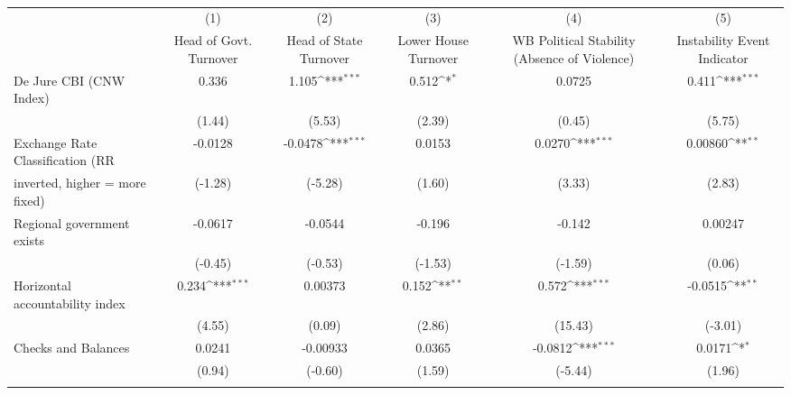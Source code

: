 \begin{table}[htbp]\centering
\def\sym#1{\ifmmode^{#1}\else\(^{#1}\)\fi}
\caption{\label{nccmultIndOLSDJ}}
\begin{tabular}{l*{5}{c}}
\toprule
                                        &\multicolumn{1}{c}{(1)}&\multicolumn{1}{c}{(2)}&\multicolumn{1}{c}{(3)}&\multicolumn{1}{c}{(4)}&\multicolumn{1}{c}{(5)}\\
                                        &\multicolumn{1}{c}{Head of Govt. Turnover}&\multicolumn{1}{c}{Head of State Turnover}&\multicolumn{1}{c}{Lower House Turnover}&\multicolumn{1}{c}{WB Political Stability (Absence of Violence)}&\multicolumn{1}{c}{Instability Event Indicator}\\
\midrule
De Jure CBI (CNW Index)                 &    0.336         &    1.105\sym{***}&    0.512\sym{*}  &   0.0725         &    0.411\sym{***}\\
                                        &   (1.44)         &   (5.53)         &   (2.39)         &   (0.45)         &   (5.75)         \\
\addlinespace
Exchange Rate Classification (RR        &  -0.0128         &  -0.0478\sym{***}&   0.0153         &   0.0270\sym{***}&  0.00860\sym{**} \\
inverted, higher = more fixed)          &  (-1.28)         &  (-5.28)         &   (1.60)         &   (3.33)         &   (2.83)         \\
\addlinespace
Regional government exists              &  -0.0617         &  -0.0544         &   -0.196         &   -0.142         &  0.00247         \\
                                        &  (-0.45)         &  (-0.53)         &  (-1.53)         &  (-1.59)         &   (0.06)         \\
\addlinespace
Horizontal accountability index         &    0.234\sym{***}&  0.00373         &    0.152\sym{**} &    0.572\sym{***}&  -0.0515\sym{**} \\
                                        &   (4.55)         &   (0.09)         &   (2.86)         &  (15.43)         &  (-3.01)         \\
\addlinespace
Checks and Balances                     &   0.0241         & -0.00933         &   0.0365         &  -0.0812\sym{***}&   0.0171\sym{*}  \\
                                        &   (0.94)         &  (-0.60)         &   (1.59)         &  (-5.44)         &   (1.96)         \\
\addlinespace

\end{tabular}
\end{table}
